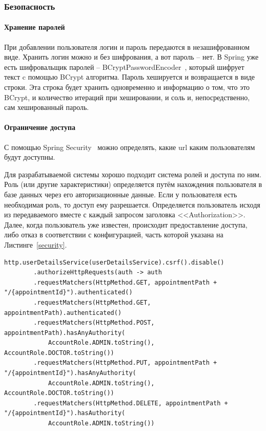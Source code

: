 \documentclass[a4paper,article]{article}
\begin{document}
\begin{sloppypar}
    \subsubsection{Безопасность}\label{Реализация. Сервер. Безопасность}

    \paragraph{Хранение паролей}

    При добавлении пользователя логин и пароль передаются в незашифрованном виде. Хранить логин можно и без шифрования, а вот пароль -- нет. В Spring уже есть шифровальщик паролей -- BCryptPasswordEncoder~\cite{baeldungbook, springguide}, который шифрует текст c помощью BCrypt алгоритма. Пароль хешируется и возвращается в виде строки. Эта строка будет хранить одновременно и информацию о том, что это BCrypt, и количество итераций при хешировании, и соль и, непосредственно, сам хешированный пароль.

    \paragraph{Ограничение доступа}

    С помощью Spring Security~\cite{springguide} можно определять, какие url каким пользователям будут доступны.

    Для разрабатываемой системы хорошо подходит система ролей и доступа по ним. Роль (или другие характеристики) определяется путём нахождения пользователя в базе данных через его авторизационные данные. Если у пользователя есть необходимая роль, то доступ ему разрешается. Определяется пользователь исходя из передаваемого вместе с каждый запросом заголовка <<Authorization>>. Далее, когда пользователь уже известен, происходит предоставление доступа, либо отказ в соответствии с конфигурацией, часть которой указана на Листинге~\ref{security}.

    \newpage

    \begin{lstlisting}[label=security,caption=Пример кода для разграничения доступа]
    http.userDetailsService(userDetailsService).csrf().disable()
        .authorizeHttpRequests(auth -> auth
        .requestMatchers(HttpMethod.GET, appointmentPath + "/{appointmentId}").authenticated()
        .requestMatchers(HttpMethod.GET, appointmentPath).authenticated()
        .requestMatchers(HttpMethod.POST, appointmentPath).hasAnyAuthority(
            AccountRole.ADMIN.toString(), AccountRole.DOCTOR.toString())
        .requestMatchers(HttpMethod.PUT, appointmentPath + "/{appointmentId}").hasAnyAuthority(
            AccountRole.ADMIN.toString(), AccountRole.DOCTOR.toString())
        .requestMatchers(HttpMethod.DELETE, appointmentPath + "/{appointmentId}").hasAuthority(
            AccountRole.ADMIN.toString())
    \end{lstlisting}


\end{sloppypar}
\end{document}
